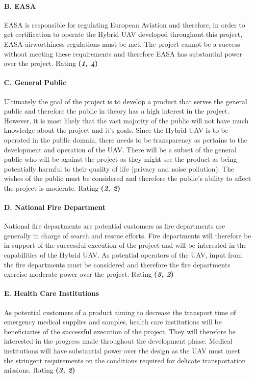\paragraph{B. EASA}
EASA is responsible for regulating European Aviation and therefore, in order to get certification to operate the Hybrid UAV developed throughout this project, EASA airworthiness regulations must be met. The project cannot be a success without meeting these requirements and therefore EASA has substantial power over the project. Rating \textbf{(\textit{1, 4})} 

\paragraph{C. General Public}
Ultimately the goal of the project is to develop a product that serves the general public and therefore the public in theory has a high interest in the project. However, it is most likely that the vast majority of the public will not have much knowledge about the project and it's goals. Since the Hybrid UAV is to be operated in the public domain, there needs to be transparency as pertains to the development and operation of the UAV. There will be a subset of the general public who will be against the project as they might see the product as being potentially harmful to their quality of life (privacy and noise pollution). The wishes of the public must be considered and therefore the public's ability to affect the project is moderate. Rating \textbf{(\textit{2, 2})} 

\paragraph{D. National Fire Department}
National fire departments are potential customers as fire departments are generally in charge of search and rescue efforts. Fire departments will therefore be in support of the successful execution of the project and will be interested in the capabilities of the Hybrid UAV. As potential operators of the UAV, input from the fire departments must be considered and therefore the fire departments exercise moderate power over the project. Rating \textbf{(\textit{3, 2})} 

\paragraph{E. Health Care Institutions}
As potential customers of a product aiming to decrease the transport time of emergency medical supplies and samples, health care institutions will be beneficiaries of the successful execution of the project. They will therefore be interested in the progress made throughout the development phase. Medical institutions will have substantial power over the design as the UAV must meet the stringent requirements on the conditions required for delicate transportation missions. Rating \textbf{(\textit{3, 2})} 

